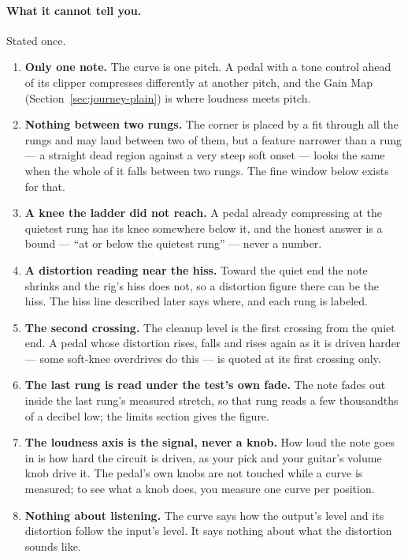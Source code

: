 \documentclass[11pt,a4paper]{article}
\begin{document}
\paragraph{What it cannot tell you.} Stated once.
\begin{enumerate}
  \item \textbf{Only one note.} The curve is one pitch. A pedal with a
  tone control ahead of its clipper compresses differently at another
  pitch, and the Gain Map (Section~\ref{sec:journey-plain}) is where
  loudness meets pitch.
  \item \textbf{Nothing between two rungs.} The corner is placed by a fit
  through all the rungs and may land between two of them, but a feature
  narrower than a rung --- a straight dead region against a very steep
  soft onset --- looks the same when the whole of it falls between two
  rungs. The fine window below exists for that.
  \item \textbf{A knee the ladder did not reach.} A pedal already
  compressing at the quietest rung has its knee somewhere below it, and
  the honest answer is a bound --- ``at or below the quietest rung'' ---
  never a number.
  \item \textbf{A distortion reading near the hiss.} Toward the quiet end
  the note shrinks and the rig's hiss does not, so a distortion figure
  there can be the hiss. The hiss line described later says where, and
  each rung is labeled.
  \item \textbf{The second crossing.} The cleanup level is the first
  crossing from the quiet end. A pedal whose distortion rises, falls and
  rises again as it is driven harder --- some soft-knee overdrives do this
  --- is quoted at its first crossing only.
  \item \textbf{The last rung is read under the test's own fade.} The
  note fades out inside the last rung's measured stretch, so that rung
  reads a few thousandths of a decibel low; the limits section gives the
  figure.
  \item \textbf{The loudness axis is the signal, never a knob.} How loud
  the note goes in is how hard the circuit is driven, as your pick and
  your guitar's volume knob drive it. The pedal's own knobs are not
  touched while a curve is measured; to see what a knob does, you measure
  one curve per position.
  \item \textbf{Nothing about listening.} The curve says how the output's
  level and its distortion follow the input's level. It says nothing about what the distortion sounds like.
\end{enumerate}
\end{document}
